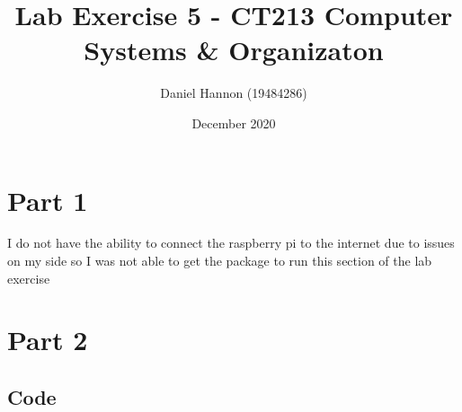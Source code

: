 \documentclass{article}
\title{Lab Exercise 5 - CT213 Computer Systems \& Organizaton}
\author{Daniel Hannon (19484286)}
\date{December 2020}
\begin{document}
	\maketitle
	\section{Part 1}
	I do not have the ability to connect the raspberry pi to the internet due to issues on my side so I was not able to get the package to run this section of the lab exercise
	\section{Part 2}
	\subsection{Code}
\end{document}
